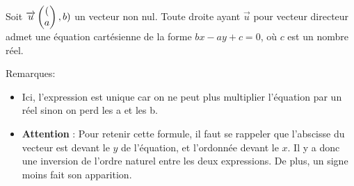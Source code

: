 \documentclass[10pt,a4paper,oneside]{book}
\begin{document}
\begin{prop}
  Soit $\overrightarrow{u}  \begin{pmatrix} (\\ a \end{pmatrix},b)$ un vecteur non nul. Toute droite ayant $\overrightarrow{u}$ pour vecteur directeur 
  admet une équation cartésienne de la forme $bx-ay+c=0$, où $c$ est un nombre réel.
\end{prop}

Remarques: 
  \begin{itemize}
  \item Ici, l'expression est unique car on ne peut plus multiplier l'équation par un réel sinon on perd les a et les b.
  \item \textbf{Attention} : Pour retenir cette formule, il faut se rappeler que l'abscisse du vecteur est devant le $y$ de l'équation, et l'ordonnée devant le $x$. Il y a donc une inversion de l'ordre naturel entre les deux expressions. De plus, un signe moins fait son apparition.
  \end{itemize}
\end{document}
